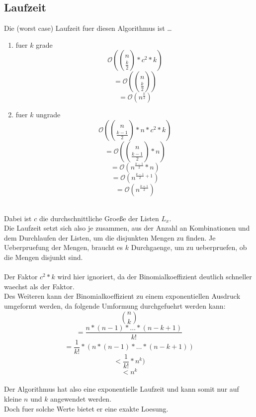 \documentclass[a4paper,10pt,ngerman]{scrartcl}
\begin{document}
\subsection{Laufzeit}
Die (worst case) Laufzeit fuer diesen Algorithmus ist \dots
\begin{enumerate}
	\item fuer $k$ grade
	$$
	\mathcal{O}(\binom{n}{\frac{k}{2}} * c^2 * k) 
	$$
	$$
	= \mathcal{O}(\binom{n}{\frac{k}{2}})
	$$
	$$
	= \mathcal{O}(n^{\frac{k}{2}}) 
	$$

	\item fuer $k$ ungrade
	$$
	\mathcal{O}(\binom{n}{\frac{k-1}{2}} * n * c^2 * k) 
	$$
	$$
	= \mathcal{O}(\binom{n}{\frac{k-1}{2}} * n) 
	$$
	$$
	= \mathcal{O}(n^{\frac{k-1}{2}} * n) 
	$$
	$$
	= \mathcal{O}(n^{\frac{k-1}{2} + 1}) 
	$$
	$$
	= \mathcal{O}(n^{\frac{k+1}{2}}) 
	$$
\end{enumerate}
\\
Dabei ist $c$ die durchschnittliche Groeße der Listen $L_x$.\\
Die Laufzeit setzt sich also je zusammen, aus der Anzahl an Kombinationen und dem Durchlaufen der Listen, um die disjunkten Mengen zu finden. Je Ueberpruefung der Mengen, 
braucht es $k$ Durchgaenge, um zu ueberpruefen, ob die Mengen disjunkt sind.
\\\\
Der Faktor $c^2 * k$ wird hier ignoriert, da der Binomialkoeffizient deutlich schneller waechst als der Faktor.\\
Des Weiteren kann der Binomialkoeffizient zu einem exponentiellen Ausdruck umgeformt werden, da folgende Umformung durchgefuehrt werden kann:\\
$$ \binom{n}{k} $$
$$ = \frac{n * (n-1) * \dots * (n-k+1)}{k!} $$
$$ = \frac{1}{k!} * (n * (n-1) * \dots * (n-k+1)) $$
$$ < \frac{1}{k!} * n^k) $$
$$ < n^k $$
\\
Der Algorithmus hat also eine exponentielle Laufzeit und kann somit nur auf kleine $n$ und $k$ angewendet werden. \\
Doch fuer solche Werte bietet er eine exakte Loesung.
\end{document}
